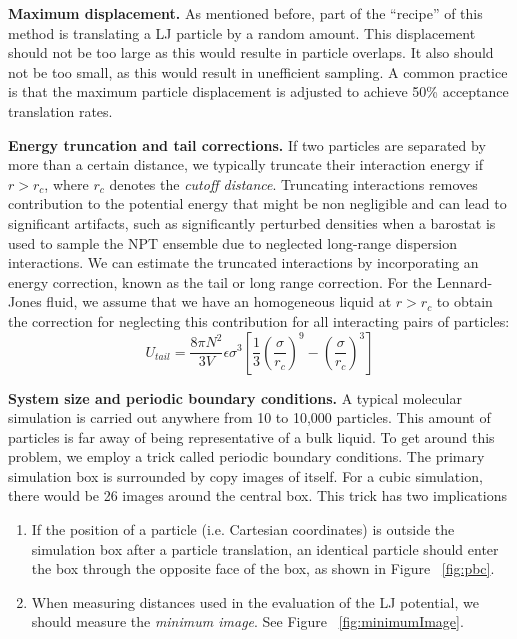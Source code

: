 \documentclass[aip,jcp,preprint,superscriptaddress,floatfix]{revtex4-1}
\begin{document}
\textbf{Maximum displacement.} As mentioned before, part of the ``recipe''
of this method is translating a LJ particle by a random amount. This
displacement should not be too large as this would resulte in particle overlaps. It also should not be too small, as this would result in unefficient sampling.
A common practice is that the maximum particle displacement is adjusted
to achieve 50\% acceptance translation rates. 

\textbf{Energy truncation and tail corrections.} If two particles are separated
by more than a certain distance, we typically truncate their interaction energy if $r > r_c$, where $r_c$ denotes the \emph{cutoff distance}. 
Truncating interactions removes contribution to the potential energy that might be non negligible and can lead to significant artifacts, such as significantly perturbed densities when a barostat is used to sample the NPT ensemble due to neglected long-range dispersion interactions. 
We can estimate the truncated interactions by incorporating an energy 
correction, known as the tail or long range correction.
For the Lennard-Jones fluid, we assume that we have an homogeneous liquid at $r>r_c$ to obtain the correction for neglecting this contribution for all interacting pairs of particles:
\begin{equation}
	U_{tail} = \frac{8 \pi N^2}{3 V} \epsilon \sigma^3
	\left[\frac{1}{3} \left(\frac{\sigma}{r_c} \right)^9 
	- \left(\frac{\sigma}{r_c} \right)^3 \right]
\end{equation}

\textbf{System size and periodic boundary conditions.} A typical molecular 
simulation is carried out anywhere from 
10 to 10,000 particles. This amount of particles is far away of being
representative of a bulk liquid. To get around this problem, we employ a trick
called
periodic boundary conditions. The primary simulation box is surrounded
by copy images of itself. For a cubic simulation, there would be 26 
images around the central box. This trick has two implications
\begin{enumerate}
	\item If the position of a particle (i.e. Cartesian coordinates) is
		outside the simulation box after a particle translation, 
		an identical particle should enter the box through the
		opposite face of the box, as shown in Figure ~\ref{fig:pbc}.
	\item When measuring distances used in the evaluation of the LJ
		potential, we should measure the \textit{minimum
		image}. See Figure ~\ref{fig:minimumImage}.
\end{enumerate}
\end{document}
